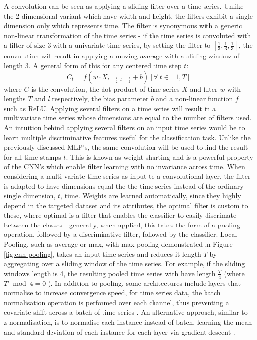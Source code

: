 \documentclass[journal]{IEEEtran}
\begin{document}
A convolution can be seen as applying a sliding filter over a time series. Unlike the 2-dimensional variant which have width and height, the filters exhibit a single dimension only which represents time. The filter is synonymous with a generic non-linear transformation of the time series - if the time series is convoluted with a filter of size 3 with a univariate time series, by setting the filter to $[\frac{1}{3}, \frac{1}{3}, \frac{1}{3}]$, the convolution will result in applying a moving average with a sliding window of length 3. A general form of this for any centered time step $t$:
\begin{equation}\label{eq:cnn}
    C_t = f(w \cdot X_{t-\frac{l}{2}, t+\frac{l}{2}} + b) \ \big\rvert \ \forall \ t \in [1, T]
\end{equation}
where $C$ is the convolution, the dot product of time series $X$ and filter $w$ with lengths $T$ and $l$ respectively, the bias parameter $b$ and a non-linear function $f$ such as ReLU. Applying several filters on a time series will result in a multivariate time series whose dimensions are equal to the number of filters used. An intuition behind applying several filters on an input time series would be to learn multiple discriminative features useful for the classification task. Unlike the previously discussed MLP's, the same convolution will be used to find the result for all time stamps $t$. This is known as weight sharting and is a powerful property of the CNN's which enable filter learning with no invariance across time. When considering a multi-variate time series as input to a convolutional layer, the filter is adapted to have dimensions equal the the time series instead of the ordinary single dimension, $t$, time.
Weights are learned automatically, since they highly depend in the targeted dataset and its attributes, the optimal filter is custom to these, where optimal is a filter that enables the classifier to easily discrimate between the classes - generally, when applied, this takes the form of a pooling operation, followed by a discriminative filter, followed by the classifier.
Local Pooling, such as average or max, with max pooling demonstrated in Figure \ref{fig:cnn-pooling}, takes an input time series and reduces it length $T$ by aggregating over a sliding window of the time series. For example, if the sliding windows length is 4, the resulting pooled time series with have length $\frac{T}{4}$ (where $T \mod 4 = 0$ ). In addition to pooling, some architectures include layers that normalise to increase convergence speed, for time series data, the batch normalisation operation is performed over each channel, thus preventing a covariate shift across a batch of time series \cite{ioffe2015}. An alternative approach, similar to z-normalisation, is to normalise each instance instead of batch, learning the mean and standard deviation of each instance for each layer via gradient descent \cite{ulyanov2016}.
\end{document}
